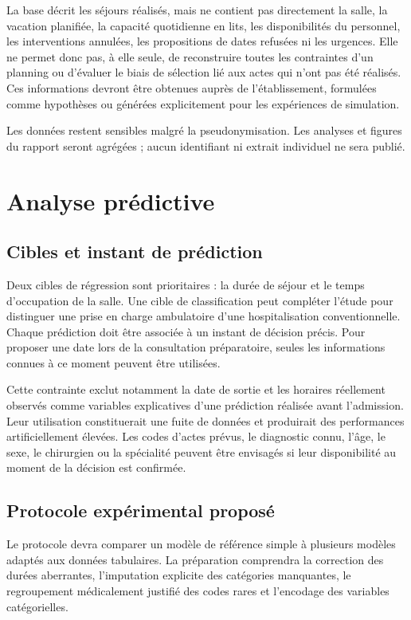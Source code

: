 La base décrit les séjours réalisés, mais ne contient pas directement la salle, la vacation planifiée, la capacité quotidienne en lits, les disponibilités du personnel, les interventions annulées, les propositions de dates refusées ni les urgences. Elle ne permet donc pas, à elle seule, de reconstruire toutes les contraintes d'un planning ou d'évaluer le biais de sélection lié aux actes qui n'ont pas été réalisés. Ces informations devront être obtenues auprès de l'établissement, formulées comme hypothèses ou générées explicitement pour les expériences de simulation.

Les données restent sensibles malgré la pseudonymisation. Les analyses et figures du rapport seront agrégées ; aucun identifiant ni extrait individuel ne sera publié.

\section{Analyse prédictive}

\subsection{Cibles et instant de prédiction}

Deux cibles de régression sont prioritaires : la durée de séjour et le temps d'occupation de la salle. Une cible de classification peut compléter l'étude pour distinguer une prise en charge ambulatoire d'une hospitalisation conventionnelle. Chaque prédiction doit être associée à un instant de décision précis. Pour proposer une date lors de la consultation préparatoire, seules les informations connues à ce moment peuvent être utilisées.

Cette contrainte exclut notamment la date de sortie et les horaires réellement observés comme variables explicatives d'une prédiction réalisée avant l'admission. Leur utilisation constituerait une fuite de données et produirait des performances artificiellement élevées. Les codes d'actes prévus, le diagnostic connu, l'âge, le sexe, le chirurgien ou la spécialité peuvent être envisagés si leur disponibilité au moment de la décision est confirmée.

\subsection{Protocole expérimental proposé}

Le protocole devra comparer un modèle de référence simple à plusieurs modèles adaptés aux données tabulaires. La préparation comprendra la correction des durées aberrantes, l'imputation explicite des catégories manquantes, le regroupement médicalement justifié des codes rares et l'encodage des variables catégorielles.

